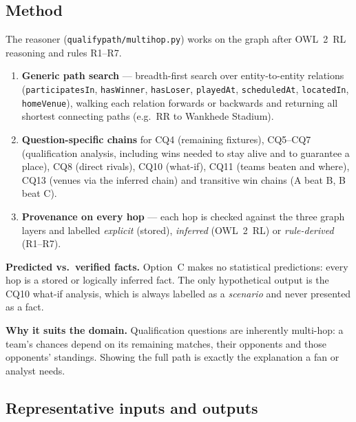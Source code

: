 \subsection{Method}
The reasoner (\texttt{qualifypath/multihop.py}) works on the graph after OWL~2~RL reasoning and rules R1--R7.
\begin{enumerate}
  \item \textbf{Generic path search} --- breadth-first search over entity-to-entity relations
        (\texttt{participatesIn}, \texttt{hasWinner}, \texttt{hasLoser}, \texttt{playedAt},
        \texttt{scheduledAt}, \texttt{locatedIn}, \texttt{homeVenue}), walking each relation forwards or
        backwards and returning all shortest connecting paths (e.g.\ RR to Wankhede Stadium).
  \item \textbf{Question-specific chains} for CQ4 (remaining fixtures), CQ5--CQ7 (qualification analysis,
        including wins needed to stay alive and to guarantee a place), CQ8 (direct rivals), CQ10 (what-if),
        CQ11 (teams beaten and where), CQ13 (venues via the inferred chain) and transitive win chains
        (A beat B, B beat C).
  \item \textbf{Provenance on every hop} --- each hop is checked against the three graph layers and labelled
        \emph{explicit} (stored), \emph{inferred} (OWL~2~RL) or \emph{rule-derived} (R1--R7).
\end{enumerate}

\textbf{Predicted vs.\ verified facts.} Option~C makes no statistical predictions: every hop is a stored or
logically inferred fact. The only hypothetical output is the CQ10 what-if analysis, which is always labelled as
a \emph{scenario} and never presented as a fact.

\textbf{Why it suits the domain.} Qualification questions are inherently multi-hop: a team's chances depend on
its remaining matches, their opponents and those opponents' standings. Showing the full path is exactly the
explanation a fan or analyst needs.

\subsection{Representative inputs and outputs}



